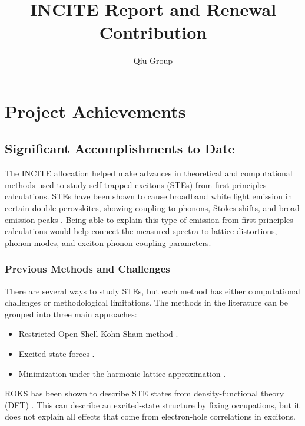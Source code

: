 \documentclass[11pt]{article}
\title{INCITE Report and Renewal Contribution}
\author{Qiu Group}
\date{}
\begin{document}
\maketitle
\tableofcontents

\section{Project Achievements}

\subsection{Significant Accomplishments to Date}

The INCITE allocation helped make advances in theoretical and computational
methods used to study self-trapped excitons (STEs) from first-principles
calculations. STEs have been shown to cause broadband white light emission in
certain double perovskites, showing coupling to phonons, Stokes shifts, and broad
emission peaks \cite{luo2018warmwhite,depaula2025time}. Being able to explain
this type of emission from first-principles calculations would help connect the
measured spectra to lattice distortions, phonon modes, and exciton-phonon
coupling parameters.

\subsubsection{Previous Methods and Challenges}

There are several ways to study STEs, but each method has
either computational challenges or methodological limitations.
The methods in the literature can be grouped
into three main approaches:
\begin{itemize}
\item Restricted Open-Shell Kohn-Sham method \cite{sahre2026roks}.
\item Excited-state forces \cite{ismailbeigi2003esf,delgrande2025esf}.
\item Minimization under the harmonic lattice approximation
    \cite{dai2024theory,dai2024firstprinciples}.
\end{itemize}

ROKS has been shown to describe STE states from density-functional theory (DFT)
\cite{sahre2026roks}. This can describe an excited-state structure by fixing
occupations, but it does not explain all effects that come from electron-hole
correlations in excitons.
\end{document}
